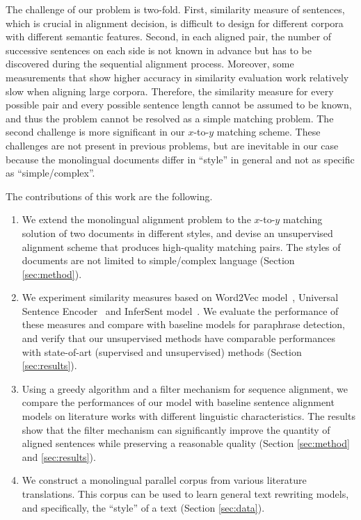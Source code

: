 \documentclass[runningheads]{llncs}
\begin{document}
\begin{spacing}{1.1}
The challenge of our problem is two-fold. First, similarity measure of sentences, which is crucial in alignment decision, is difficult to design for different corpora with different semantic features. Second, in each aligned pair, the number of successive sentences on each side is not known in advance but has to be discovered during the sequential alignment process. Moreover, some measurements that show higher accuracy in similarity evaluation work relatively slow when aligning large corpora. Therefore, the similarity measure for every possible pair and every possible sentence length cannot be assumed to be known, and thus the problem cannot be resolved as a simple matching problem. The second challenge is more significant in our $x$-to-$y$ matching scheme. These challenges are not present in previous problems, but are inevitable in our case because the monolingual documents differ in ``style'' in general and not as specific as ``simple/complex''.

The contributions of this work are the following.
\begin{enumerate}
	\item We extend the monolingual alignment problem to the $x$-to-$y$ matching solution of two documents in different styles, and devise an unsupervised alignment scheme that produces high-quality matching pairs. The styles of documents are not limited to simple/complex language (Section \ref{sec:method}).
	\item We experiment similarity measures based on Word2Vec model~\cite{mikolov2013distributed}, Universal Sentence Encoder~\cite{cer2018universal} and InferSent model~\cite{conneau2017supervised}. We evaluate the performance of these measures and compare with baseline models for paraphrase detection, and verify that our unsupervised methods have comparable performances with state-of-art (supervised and unsupervised) methods (Section \ref{sec:results}).
	\item Using a greedy algorithm and a filter mechanism for sequence alignment, we compare the performances of our model with baseline sentence alignment models on literature works with different linguistic characteristics. The results show that the filter mechanism can significantly improve the quantity of aligned sentences while preserving a reasonable quality (Section \ref{sec:method} and \ref{sec:results}).
	\item We construct a monolingual parallel corpus from various literature translations. This corpus can be used to learn general text rewriting models, and specifically, the ``style'' of a text (Section \ref{sec:data}).
\end{enumerate}


\end{spacing}
\end{document}
